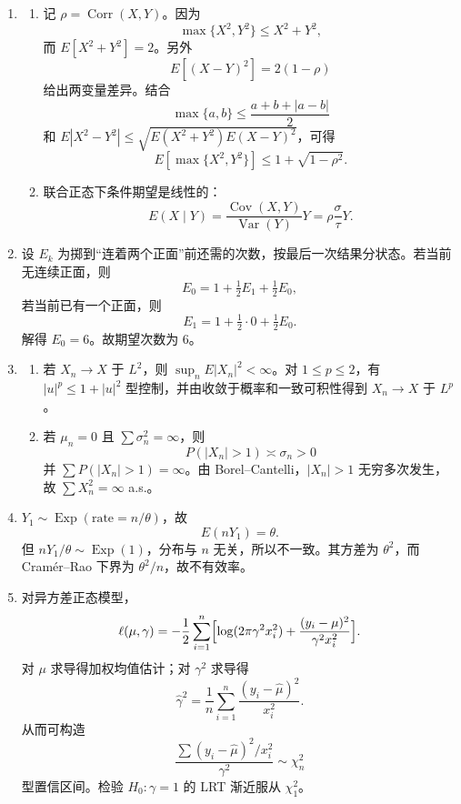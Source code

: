 \documentclass[UTF8,12pt]{ctexart}
\begin{document}
\begin{enumerate}[label=\textbf{\arabic*.},leftmargin=2.2em]
\item
\begin{enumerate}[label=\textbf{\arabic*)},leftmargin=2.4em]
\item 记 \(\rho=\operatorname{Corr}(X,Y)\)。因为
\[
\max\{X^2,Y^2\}\le X^2+Y^2,
\]
而 \(E[X^2+Y^2]=2\)。另外
\[
E[(X-Y)^2]=2(1-\rho)
\]
给出两变量差异。结合
\[
\max\{a,b\}\le \frac{a+b+|a-b|}{2}
\]
和 \(E|X^2-Y^2|\le \sqrt{E(X^2+Y^2)E(X-Y)^2}\)，可得
\[
E[\max\{X^2,Y^2\}]\le 1+\sqrt{1-\rho^2}.
\]

\item 联合正态下条件期望是线性的：
\[
E(X\mid Y)=\frac{\operatorname{Cov}(X,Y)}{\operatorname{Var}(Y)}Y
=\rho\frac{\sigma}{\tau}Y.
\]
\end{enumerate}

\item 设 \(E_k\) 为掷到“连着两个正面”前还需的次数，按最后一次结果分状态。若当前无连续正面，则
\[
E_0=1+\tfrac12E_1+\tfrac12E_0,
\]
若当前已有一个正面，则
\[
E_1=1+\tfrac12\cdot0+\tfrac12E_0.
\]
解得 \(E_0=6\)。故期望次数为 6。

\item
\begin{enumerate}[label=\textbf{\arabic*)},leftmargin=2.4em]
\item 若 \(X_n\to X\) 于 \(L^2\)，则 \(\sup_n E|X_n|^2<\infty\)。对 \(1\le p\le2\)，有 \(|u|^p\le 1+|u|^2\) 型控制，并由收敛于概率和一致可积性得到 \(X_n\to X\) 于 \(L^p\)。

\item 若 \(\mu_n=0\) 且 \(\sum \sigma_n^2=\infty\)，则
\[
P(|X_n|>1)\asymp \sigma_n>0
\]
并 \(\sum P(|X_n|>1)=\infty\)。由 Borel--Cantelli，\(|X_n|>1\) 无穷多次发生，故 \(\sum X_n^2=\infty\) a.s.。
\end{enumerate}

\item \(Y_1\sim\operatorname{Exp}(\text{rate}=n/\theta)\)，故
\[
E(nY_1)=\theta.
\]
但 \(nY_1/\theta\sim \operatorname{Exp}(1)\)，分布与 \(n\) 无关，所以不一致。其方差为 \(\theta^2\)，而 Cramér--Rao 下界为 \(\theta^2/n\)，故不有效率。

\item 对异方差正态模型，
\[
\ell(\mu,\gamma)=-\frac12\sum_{i=1}^n\Bigl[\log(2\pi\gamma^2x_i^2)+\frac{(y_i-\mu)^2}{\gamma^2x_i^2}\Bigr].
\]
对 \(\mu\) 求导得加权均值估计；对 \(\gamma^2\) 求导得
\[
\hat\gamma^2=\frac1n\sum_{i=1}^n \frac{(y_i-\hat\mu)^2}{x_i^2}.
\]
从而可构造
\[
\frac{\sum (y_i-\hat\mu)^2/x_i^2}{\gamma^2}\sim \chi_n^2
\]
型置信区间。检验 \(H_0:\gamma=1\) 的 LRT 渐近服从 \(\chi^2_1\)。
\end{enumerate}
\end{document}
